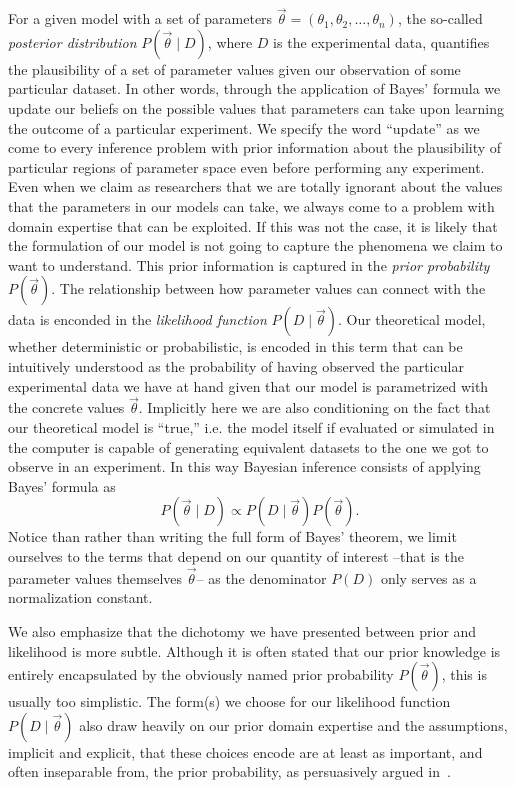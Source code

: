 For a given model with a set of parameters $\vec{\theta} = (\theta_1, \theta_2,
\ldots, \theta_n)$, the so-called \textit{posterior distribution} 
$P(\vec{\theta} \mid D)$, where $D$ is the experimental data, quantifies the
plausibility of a set of parameter values given our observation of some
particular dataset. In other words, through the application of Bayes' formula we
update our beliefs on the possible values that parameters can take upon learning
the outcome of a particular experiment. We specify the word ``update'' as we
come to every inference problem with prior information about the plausibility of
particular regions of parameter space even before performing any experiment.
Even when we claim as researchers that we are totally ignorant about the values
that the parameters in our models can take, we always come to a problem with
domain expertise that can be exploited. If this was not the case, it is likely
that the formulation of our model is not going to capture the phenomena we claim
to want to understand. This prior information is captured in the \textit{prior
probability} $P(\vec{\theta})$. The relationship between how parameter values
can connect with the data is enconded in the \textit{likelihood function} $P(D
\mid \vec{\theta})$. Our theoretical model, whether deterministic or
probabilistic, is encoded in this term that can be intuitively understood as the
probability of having observed the particular experimental data we have at hand
given that our model is parametrized with the concrete values $\vec{\theta}$. 
Implicitly here we are also conditioning on the fact that our theoretical model
is ``true,'' i.e. the model itself if evaluated or simulated in the computer is
capable of generating equivalent datasets to the one we got to observe in an 
experiment. In this way Bayesian inference consists of applying Bayes' formula 
as 
\begin{equation}
P(\vec{\theta} \mid D) \propto P(D \mid \vec{\theta}) P(\vec{\theta}).
\end{equation}
Notice than rather than writing the full form of Bayes' theorem, we limit 
ourselves to the terms that depend on our quantity of interest --that is the 
parameter values themselves $\vec{\theta}$-- as the denominator $P(D)$ only
serves as a normalization constant.

We also emphasize that the dichotomy we have presented between prior and
likelihood is more subtle. Although it is often stated that our prior
knowledge is entirely encapsulated by the obviously named prior
probability $P(\vec{\theta})$, this is usually too simplistic.
The form(s) we choose for our likelihood function
$P(D \mid \vec{\theta})$ also draw heavily on our prior domain expertise
and the assumptions, implicit and explicit, that these choices encode are
at least as important, and often inseparable from,
the prior probability, as persuasively argued in~\cite{Gelman2017}.

